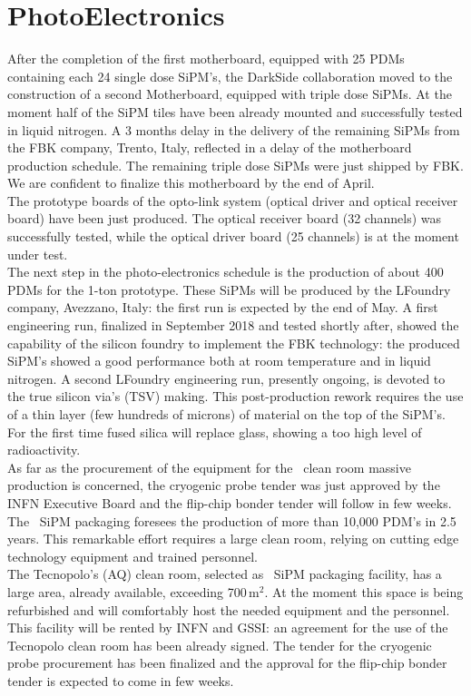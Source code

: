 \label{sec:PE}
\section {PhotoElectronics}

After the completion of the first motherboard, equipped with 25 PDMs containing each 24 single dose SiPM's, the DarkSide collaboration moved to the construction of a second Motherboard, equipped with triple dose SiPMs. At the moment half of the SiPM tiles have been already mounted and successfully tested in liquid nitrogen. A 3 months delay in the delivery of the remaining SiPMs from the FBK company, Trento, Italy, reflected in a delay of the motherboard production schedule. The remaining triple dose SiPMs were just shipped by FBK. We are confident to finalize this motherboard by the end of April.\\
The prototype boards of the opto-link system (optical driver and optical receiver board) have been just produced. The optical receiver board (32 channels) was successfully tested, while the optical driver board (25 channels) is at the moment under test. \\
The next step in the photo-electronics schedule is the production of about 400 PDMs for the 1-ton prototype. These SiPMs will be produced by the LFoundry company, Avezzano, Italy: the first run is expected by the end of May. A first engineering run, finalized in September 2018 and tested shortly after, showed the capability of the silicon foundry to implement the FBK technology: the produced SiPM's showed a good performance both at room temperature and in liquid nitrogen. A second LFoundry engineering run, presently ongoing, is devoted to the true silicon via's (TSV) making. This post-production rework requires the use of a thin layer (few hundreds of microns) of material on the top of the SiPM's. For the first time fused silica will replace glass, showing a too high level of radioactivity.\\
As far as the procurement of the equipment for the \DSk\ clean room massive production is concerned, the cryogenic probe tender was just approved by the INFN Executive Board and the flip-chip bonder tender will follow in few weeks. \\
The \DSk\ SiPM packaging foresees the production of more than 10,000 PDM's in 2.5 years. 
This remarkable effort requires a large clean room, relying on cutting edge technology equipment and 
trained personnel.\\
The Tecnopolo's (AQ) clean room, selected as  \DSk\ SiPM packaging facility, has a
large area, already available, exceeding 700\,m$^{2}$. At the moment this space is being refurbished and will comfortably host 
the needed equipment and the personnel. 
This facility will be rented by INFN and GSSI:  an agreement for the use of the Tecnopolo clean room has been already signed. 
The tender for the cryogenic probe procurement  
has been finalized and the approval for the  flip-chip bonder tender is expected to come in few weeks. 

